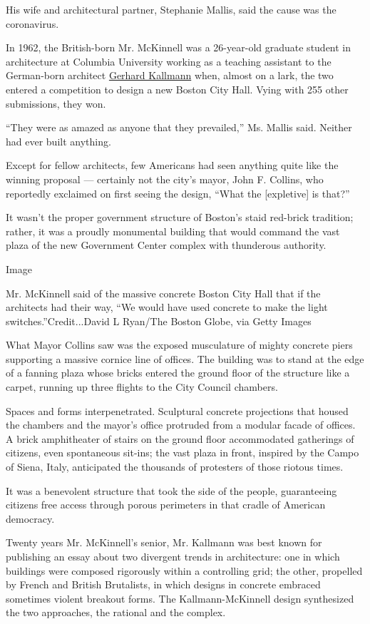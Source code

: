 His wife and architectural partner, Stephanie Mallis, said the cause was
the coronavirus.

In 1962, the British-born Mr. McKinnell was a 26-year-old graduate
student in architecture at Columbia University working as a teaching
assistant to the German-born architect
\href{https://www.nytimes3xbfgragh.onion/2012/06/25/arts/design/gerhard-kallmann-architect-dies-at-97.html}{Gerhard
Kallmann} when, almost on a lark, the two entered a competition to
design a new Boston City Hall. Vying with 255 other submissions, they
won.

``They were as amazed as anyone that they prevailed,'' Ms. Mallis said.
Neither had ever built anything.

Except for fellow architects, few Americans had seen anything quite like
the winning proposal --- certainly not the city's mayor, John F.
Collins, who reportedly exclaimed on first seeing the design, ``What the
{[}expletive{]} is that?''

It wasn't the proper government structure of Boston's staid red-brick
tradition; rather, it was a proudly monumental building that would
command the vast plaza of the new Government Center complex with
thunderous authority.

Image

Mr. McKinnell said of the massive concrete Boston City Hall that if the
architects had their way, ``We would have used concrete to make the
light switches.''Credit...David L Ryan/The Boston Globe, via Getty
Images

What Mayor Collins saw was the exposed musculature of mighty concrete
piers supporting a massive cornice line of offices. The building was to
stand at the edge of a fanning plaza whose bricks entered the ground
floor of the structure like a carpet, running up three flights to the
City Council chambers.

Spaces and forms interpenetrated. Sculptural concrete projections that
housed the chambers and the mayor's office protruded from a modular
facade of offices. A brick amphitheater of stairs on the ground floor
accommodated gatherings of citizens, even spontaneous sit-ins; the vast
plaza in front, inspired by the Campo of Siena, Italy, anticipated the
thousands of protesters of those riotous times.

It was a benevolent structure that took the side of the people,
guaranteeing citizens free access through porous perimeters in that
cradle of American democracy.

Twenty years Mr. McKinnell's senior, Mr. Kallmann was best known for
publishing an essay about two divergent trends in architecture: one in
which buildings were composed rigorously within a controlling grid; the
other, propelled by French and British Brutalists, in which designs in
concrete embraced sometimes violent breakout forms. The
Kallmann-McKinnell design synthesized the two approaches, the rational
and the complex.

